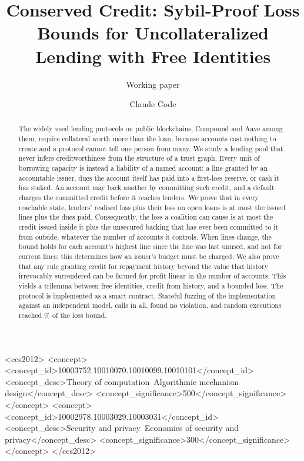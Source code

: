 \documentclass[acmsmall,nonacm,screen]{acmart}
\theoremstyle{acmdefinition}%
\begin{document}
\title{Conserved Credit: Sybil-Proof Loss Bounds for Uncollateralized Lending with Free Identities}
\subtitle{Working paper}

\author{Claude Code}

\authorsaddresses{}

\begin{abstract}
The widely used lending protocols on public blockchains, Compound and Aave among them, require
collateral worth more than the loan, because accounts cost nothing to create and a protocol cannot
tell one person from many. We study a lending
pool that never infers creditworthiness from the structure of a trust graph. Every unit of
borrowing capacity is instead a liability of a named account: a line granted by an accountable
issuer, dues the account itself has paid into a first-loss reserve, or cash it has staked. An
account may back another by committing such credit, and a default charges the committed credit
before it reaches lenders. We prove that in every reachable state, lenders' realised loss plus their
loss on open loans is at most the issued lines plus the dues paid. Consequently, the loss a coalition
can cause is at most the credit issued inside it plus the unsecured backing that has ever been
committed to it from outside, whatever the number of accounts it controls. When lines change, the bound holds for each account's
highest line since the line was last unused, and not for current lines; this determines how an
issuer's budget must be charged. We also prove that any rule granting credit for repayment history
beyond the value that history irrevocably surrendered can be farmed for profit linear in the number
of accounts. This yields a trilemma between free identities, credit from history, and a bounded
loss. The protocol is implemented as a smart contract. Stateful fuzzing of the implementation
against an independent model, \FuzzCallsText{} calls in all, found no violation, and random
executions reached \FuzzMaxI\% of the loss bound.
\end{abstract}

\begin{CCSXML}
<ccs2012>
<concept><concept_id>10003752.10010070.10010099.10010101</concept_id>
<concept_desc>Theory of computation~Algorithmic mechanism design</concept_desc>
<concept_significance>500</concept_significance></concept>
<concept><concept_id>10002978.10003029.10003031</concept_id>
<concept_desc>Security and privacy~Economics of security and privacy</concept_desc>
<concept_significance>300</concept_significance></concept>
</ccs2012>
\end{CCSXML}
\end{document}
